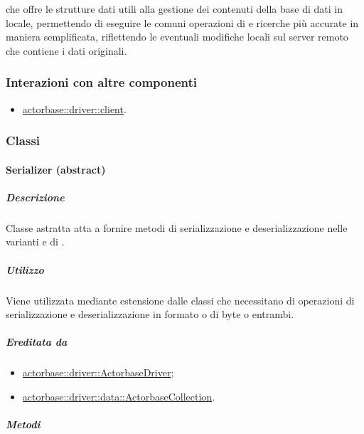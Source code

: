 \documentclass{scalatekids-article}
\begin{document}
 che offre le strutture dati utili alla gestione dei contenuti
della base di dati in locale, permettendo di eseguire le comuni operazioni di
 e ricerche più accurate in maniera semplificata, riflettendo le
eventuali modifiche locali sul server remoto che contiene i dati originali.

\subsubsection{Interazioni con altre componenti}
\begin{itemize}
\item \hyperref[sec:actorbase::driver::client]{actorbase::driver::client}.
\end{itemize}

\subsubsection{Classi}

\paragraph{Serializer (abstract)}
\label{sec:actorbase::driver::client::data::Serializer}

\subparagraph{Descrizione}

Classe astratta atta a fornire metodi di serializzazione e deserializzazione nelle
varianti  e  di .

\subparagraph{Utilizzo}

Viene utilizzata mediante estensione dalle classi che necessitano di operazioni di
serializzazione e deserializzazione in formato  o  di byte
o entrambi.

\subparagraph{Ereditata da}
\begin{itemize}
\item \hyperref[sec:actorbase::driver::ActorbaseDriver]{actorbase::driver::ActorbaseDriver};
\item \hyperref[sec:actorbase::driver::data::ActorbaseCollection]{actorbase::driver::data::ActorbaseCollection}.
\end{itemize}

\subparagraph{Metodi}
\end{document}
